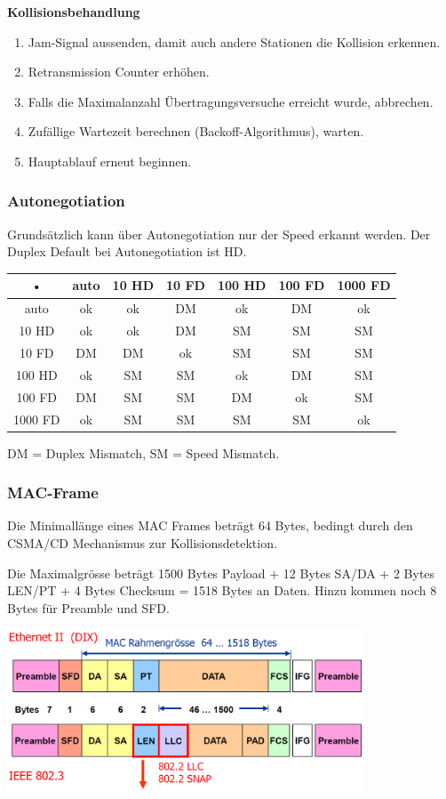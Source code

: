 \textbf{Kollisionsbehandlung}

\begin{enumerate}
	\item Jam-Signal aussenden, damit auch andere Stationen die Kollision erkennen.
	\item Retransmission Counter erhöhen.
	\item Falls die Maximalanzahl Übertragungsversuche erreicht wurde, abbrechen.
	\item Zufällige Wartezeit berechnen (Backoff-Algorithmus), warten.
	\item Hauptablauf erneut beginnen.
\end{enumerate}


\subsubsection{Autonegotiation}

Grundsätzlich kann über Autonegotiation nur der Speed erkannt werden. Der Duplex
Default bei Autonegotiation ist HD.

\begin{tabular}{|c|c|c|c|c|c|c|}
\hline
• & auto & 10 HD & 10 FD & 100 HD & 100 FD & 1000 FD \\
\hline
auto & ok & ok & DM & ok & DM & ok \\
\hline
10 HD & ok & ok & DM & SM & SM & SM \\
\hline
10 FD & DM & DM & ok & SM & SM & SM \\
\hline
100 HD & ok & SM & SM & ok & DM & SM \\
\hline
100 FD & DM & SM & SM & DM & ok & SM \\
\hline
1000 FD & ok & SM & SM & SM & SM & ok \\
\hline
\end{tabular}

DM = Duplex Mismatch, SM = Speed Mismatch.


\subsubsection{MAC-Frame}

Die Minimallänge eines MAC Frames beträgt 64 Bytes, bedingt durch den CSMA/CD
Mechanismus zur Kollisionsdetektion.

Die Maximalgrösse beträgt 1500 Bytes Payload + 12 Bytes SA/DA + 2 Bytes LEN/PT +
4 Bytes Checksum = 1518 Bytes an Daten. Hinzu kommen noch 8 Bytes für Preamble
und SFD.

\begin{center}
	\includegraphics[width=0.8\textwidth]{media/MACFrame.png}
\end{center}

